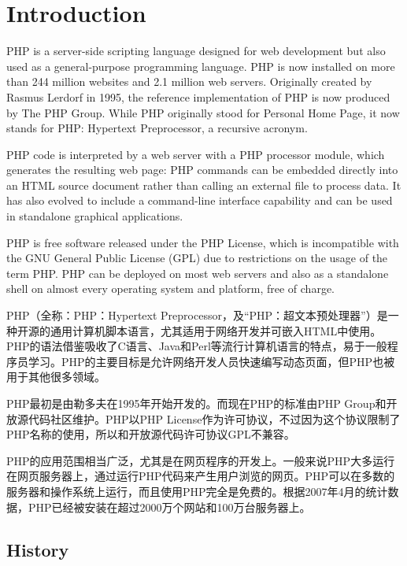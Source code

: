 \part{Introduction}

PHP is a server-side scripting language designed for web development but also used as a general-purpose programming language. PHP is now installed on more than 244 million websites and 2.1 million web servers. Originally created by Rasmus Lerdorf in 1995, the reference implementation of PHP is now produced by The PHP Group. While PHP originally stood for Personal Home Page, it now stands for PHP: Hypertext Preprocessor, a recursive acronym.

PHP code is interpreted by a web server with a PHP processor module, which generates the resulting web page: PHP commands can be embedded directly into an HTML source document rather than calling an external file to process data. It has also evolved to include a command-line interface capability and can be used in standalone graphical applications.

PHP is free software released under the PHP License, which is incompatible with the GNU General Public License (GPL) due to restrictions on the usage of the term PHP. PHP can be deployed on most web servers and also as a standalone shell on almost every operating system and platform, free of charge.

PHP（全称：PHP：Hypertext Preprocessor，及“PHP：超文本预处理器”）是一种开源的通用计算机脚本语言，尤其适用于网络开发并可嵌入HTML中使用。PHP的语法借鉴吸收了C语言、Java和Perl等流行计算机语言的特点，易于一般程序员学习。PHP的主要目标是允许网络开发人员快速编写动态页面，但PHP也被用于其他很多领域。

PHP最初是由勒多夫在1995年开始开发的。而现在PHP的标准由PHP Group和开放源代码社区维护。PHP以PHP License作为许可协议，不过因为这个协议限制了PHP名称的使用，所以和开放源代码许可协议GPL不兼容。

PHP的应用范围相当广泛，尤其是在网页程序的开发上。一般来说PHP大多运行在网页服务器上，通过运行PHP代码来产生用户浏览的网页。PHP可以在多数的服务器和操作系统上运行，而且使用PHP完全是免费的。根据2007年4月的统计数据，PHP已经被安装在超过2000万个网站和100万台服务器上。


\chapter{History}


